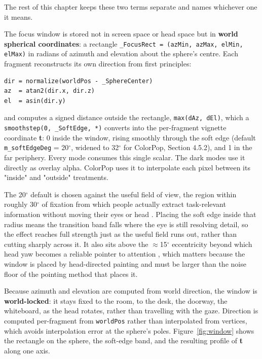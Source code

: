 The rest of this chapter keeps these two terms separate and names whichever one it means.

The focus window is stored not in screen space or head space but in \textbf{world spherical
coordinates}: a rectangle
\verb|_FocusRect = (azMin, azMax, elMin, elMax)| in radians of azimuth and elevation about the sphere's
centre. Each fragment reconstructs its own direction from first principles:

\begin{verbatim}
dir = normalize(worldPos - _SphereCenter)
az  = atan2(dir.x, dir.z)
el  = asin(dir.y)
\end{verbatim}

and computes a signed distance outside the rectangle, \verb|max(dAz, dEl)|, which a
\verb|smoothstep(0, _SoftEdge, *)| converts into the per-fragment vignette coordinate \textbf{t}: 0 inside
the window, rising smoothly through the soft edge (default \verb|m_softEdgeDeg| = 20$^{\circ}$, widened to 32$^{\circ}$
for ColorPop, Section 4.5.2), and 1 in the far periphery. Every mode consumes this single scalar.
The dark modes use it directly as overlay alpha. ColorPop uses it to interpolate each pixel between
its "inside" and "outside" treatments.

The 20$^{\circ}$ default is chosen against the useful field of view, the region within roughly
30$^{\circ}$ of fixation from which people actually extract task-relevant information without moving
their eyes or head \citep{ball1993}. Placing the soft edge inside that radius means the
transition band falls where the eye is still resolving detail, so the effect reaches full strength
just as the useful field runs out, rather than cutting sharply across it. It also sits above the
$\approx$15$^{\circ}$ eccentricity beyond which head yaw becomes a reliable pointer to attention \citep{higgins2022}, which matters because the window is placed by head-directed painting and must be
larger than the noise floor of the pointing method that places it.

Because azimuth and elevation are computed from world direction, the window is \textbf{world-locked}: it
stays fixed to the room, to the desk, the doorway, the whiteboard, as the head rotates, rather
than travelling with the gaze. Direction is computed per-fragment from \verb|worldPos| rather than
interpolated from vertices, which avoids interpolation error at the sphere's poles.
Figure~\ref{fig:window} shows the rectangle on the sphere, the soft-edge band, and the resulting
profile of \textbf{t} along one axis.

